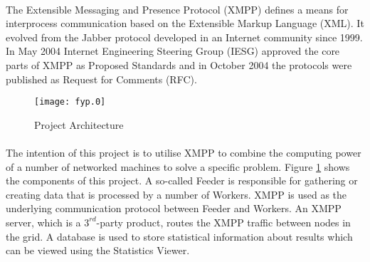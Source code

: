 \paragraph{}
The Extensible Messaging and Presence Protocol (XMPP) defines a means for interprocess communication based on the Extensible Markup Language (XML). It evolved from the Jabber protocol developed in an Internet community since 1999. In May 2004 Internet Engineering Steering Group (IESG) approved the core parts of XMPP \cite{xmpp-core,xmpp-im} as Proposed Standards and in October 2004 the protocols were published as Request for Comments (RFC).

\begin{figure}[H]
\begin{center}
\texttt{[image: fyp.0]}
\end{center}
\caption{Project Architecture}
\label{fig:architectureIntro}
\end{figure}

\paragraph{}
The intention of this project is to utilise XMPP to combine the computing power of a number of networked machines to solve a specific problem. Figure \ref{fig:architectureIntro} shows the components of this project. A so-called Feeder is responsible for gathering or creating data that is processed by a number of Workers. XMPP is used as the underlying communication protocol between Feeder and Workers. An XMPP server, which is a $3^{rd}$-party product, routes the XMPP traffic between nodes in the grid. A database is used to store statistical information about results which can be viewed using the Statistics Viewer.
